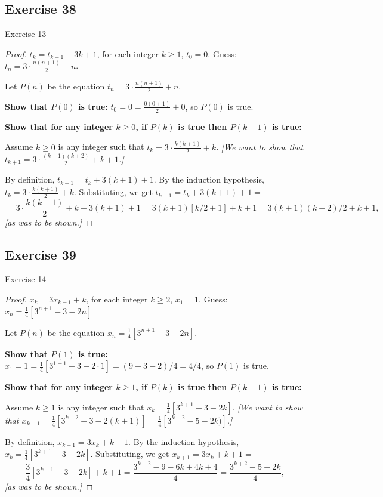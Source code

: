 \documentclass[14pt]{extarticle}
\newcommand{\dps}{\displaystyle}
\begin{document}
\subsection{Exercise 38}
Exercise 13

\begin{proof}
\(t_k = t_{k-1} + 3k + 1\), for each integer \(k \geq 1\), \(t_0 = 0\). 
Guess: \(\dps t_n = 3 \cdot \frac{n(n+1)}{2} + n\).

Let $P(n)$ be the equation \(\dps t_n = 3 \cdot \frac{n(n+1)}{2} + n\).

{\bf Show that \(P(0)\) is true:} \(t_0 = 0 = \dps \frac{0(0+1)}{2} + 0\), so $P(0)$ is true.

{\bf Show that for any integer \(k \geq 0\), if \(P(k)\) is true then \(P(k+1)\) is true:}

Assume \(k \geq 0\) is any integer such that \(\dps t_k = 3 \cdot \frac{k(k+1)}{2} + k\). 
{\it [We want to show that \(\dps t_{k+1} = 3 \cdot \frac{(k+1)(k+2)}{2} + k+1\).]}

By definition, \(t_{k+1} = t_k + 3(k+1) + 1\).
By the induction hypothesis, \(\dps t_k = 3 \cdot \frac{k(k+1)}{2} + k\). 
Substituting, we get \(t_{k+1} = t_k + 3(k+1) + 1 = \)
\[
= 3 \cdot \frac{k(k+1)}{2} + k + 3(k+1) + 1 = 3(k+1)[k / 2 + 1] + k + 1 = 3(k+1)(k+2) / 2 + k + 1,
\]
{\it [as was to be shown.]}
\end{proof}

\subsection{Exercise 39}
Exercise 14

\begin{proof}
\(x_k = 3x_{k-1} + k\), for each integer \(k \geq 2\), \(x_1 = 1\).  
Guess: \(\dps x_n = \frac{1}{4}\left[3^{n+1} - 3 - 2n\right]\)

Let $P(n)$ be the equation \(\dps x_n = \frac{1}{4}\left[3^{n+1} - 3 - 2n\right]\).

{\bf Show that \(P(1)\) is true:} \(x_1 = 1 = \dps \frac{1}{4}\left[3^{1+1} - 3 - 2 \cdot 1\right] 
= (9 - 3 - 2) / 4 = 4/4\), so $P(1)$ is true.

{\bf Show that for any integer \(k \geq 1\), if \(P(k)\) is true then \(P(k+1)\) is true:}

Assume \(k \geq 1\) is any integer such that \(\dps x_k = \frac{1}{4}\left[3^{k+1} - 3 - 2k\right]\).
{\it [We want to show that \(\dps x_{k+1} = \frac{1}{4}\left[3^{k+2} - 3 - 2(k+1)\right]
= \frac{1}{4}\left[3^{k+2} - 5 - 2k)\right]\).]}

By definition, \(x_{k+1} = 3x_k + k + 1\).
By the induction hypothesis, \(\dps x_k = \frac{1}{4}\left[3^{k+1} - 3 - 2k\right]\).
Substituting, we get \(x_{k+1} = 3x_k + k + 1 = \)
\[
\frac{3}{4}\left[3^{k+1} - 3 - 2k\right] + k + 1 = 
\frac{3^{k+2} - 9 - 6k + 4k + 4}{4} =
\frac{3^{k+2} - 5 - 2k}{4},
\]
{\it [as was to be shown.]}
\end{proof}
\end{document}
